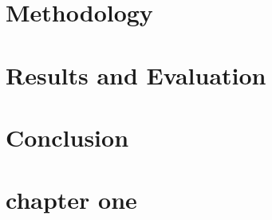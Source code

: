 \documentclass[12pt, a4paper]{report}
\newcommand\blankpage{%
    \null
    \thispagestyle{empty}%
    \newpage}
\begin{document}
\graphicspath{{./references/images/}}
\VerbatimFootnotes

\pagestyle{empty}






\afterpage{\blankpage}

\tableofcontents
\thispagestyle{empty}


\newpage

\listoffigures
\thispagestyle{empty}


\newpage

\listoftables
\thispagestyle{empty}


\newpage

\listofalgorithms
\thispagestyle{empty}


\newpage

\pagestyle{fancy}
\fancyhead[R]{\thepage}
\fancyfoot{}










\chapter{Methodology}

\chapter{Results and Evaluation}

\chapter{Conclusion}


\newpage


\nocite{*}


\appendix
\chapter{chapter one}
\end{document}
